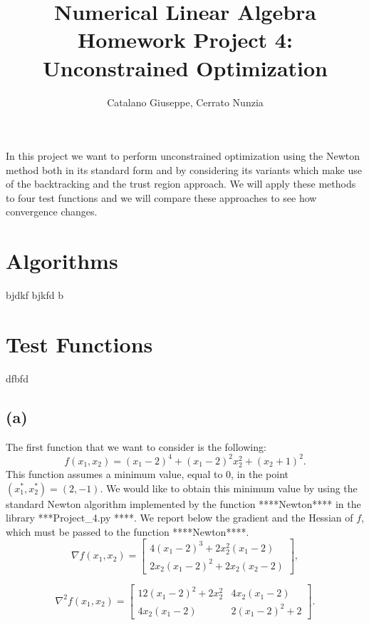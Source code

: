 \documentclass[a4paper,11pt]{article}
\begin{document}
	\author{Catalano Giuseppe, Cerrato Nunzia}
	\title{Numerical Linear Algebra Homework Project 4:\\Unconstrained Optimization}
	\date{}
	\maketitle
	
	In this project we want to perform unconstrained optimization using the Newton method both in its standard form and by considering its variants which make use of the backtracking and the trust region approach. We will apply these methods to four test functions and we will compare these approaches to see how convergence changes.
	
	\section{Algorithms}
	bjdkf bjkfd b
	\section{Test Functions}
	dfbfd
	\subsection*{(a)}
	The first function that we want to consider is the following:
	\begin{equation}
		f(x_{1},x_{2}) = (x_{1}-2)^{4} + (x_{1}-2)^{2}x_{2}^{2} + (x_{2}+1)^{2}.
	\end{equation}
	This function assumes a minimum value, equal to $0$, in the point $(x_{1}^*,x_{2}^*)=(2,-1)$. We would like to obtain this minimum value by using the standard Newton algorithm implemented by the function ****Newton**** in the library ***Project\_4.py ****. We report below the gradient and the Hessian of $f$, which must be passed to the function ****Newton****.
	\begin{equation}
		\nabla f(x_{1},x_{2}) = \begin{bmatrix}
			4(x_{1}-2)^{3} + 2x_{2}^{2}(x_{1}-2)\\
			2x_{2}(x_{1}-2)^{2} + 2x_{2}(x_{2}-2)
		\end{bmatrix},
	\end{equation}

		\begin{equation}
		\nabla^{2} f(x_{1},x_{2}) = \begin{bmatrix}
			12(x_{1}-2)^{2} + 2x_{2}^{2} & 4x_{2}(x_{1}-2)\\
			4x_{2}(x_{1}-2) & 2(x_{1}-2)^{2} + 2
		\end{bmatrix}.
	\end{equation}
	
\end{document}
